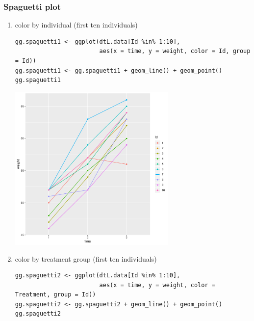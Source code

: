 \documentclass{article}
\begin{document}
\subsubsection{Spaguetti plot}
\label{sec:org767d821}

\begin{enumerate}
\item color by individual (first ten individuals)
\label{sec:orge416bf2}

\lstset{language=r,label= ,caption= ,captionpos=b,numbers=none}
\begin{lstlisting}
gg.spaguetti1 <- ggplot(dtL.data[Id %in% 1:10], 
						aes(x = time, y = weight, color = Id, group = Id))
gg.spaguetti1 <- gg.spaguetti1 + geom_line() + geom_point()
gg.spaguetti1
\end{lstlisting}

\begin{center}
\includegraphics[width=0.65\textwidth]{./figures/fig-spaguetti1.pdf}
\end{center}


\clearpage

\item color by treatment group (first ten individuals)
\label{sec:orgfa9038c}

\lstset{language=r,label= ,caption= ,captionpos=b,numbers=none}
\begin{lstlisting}
gg.spaguetti2 <- ggplot(dtL.data[Id %in% 1:10],
						aes(x = time, y = weight, color = Treatment, group = Id))
gg.spaguetti2 <- gg.spaguetti2 + geom_line() + geom_point()
gg.spaguetti2
\end{lstlisting}


\end{enumerate}
\end{document}
